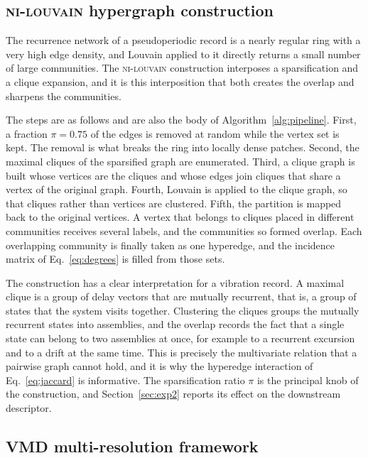 \documentclass[10pt,a4paper,twocolumn]{article}
\newcommand{\nilouvain}{\textsc{ni-louvain}}
\begin{document}
\subsection{\nilouvain{} hypergraph construction}
\label{sec:nilouvain}

The recurrence network of a pseudoperiodic record is a nearly regular ring
with a very high edge density, and Louvain applied to it directly returns a
small number of large communities.  The \nilouvain{} construction interposes a
sparsification and a clique expansion, and it is this interposition that both
creates the overlap and sharpens the communities.

The steps are as follows and are also the body of
Algorithm~\ref{alg:pipeline}.  First, a fraction $\pi = 0.75$ of the edges is
removed at random while the vertex set is kept.  The removal is what breaks
the ring into locally dense patches.  Second, the maximal cliques of the
sparsified graph are enumerated.  Third, a clique graph is built whose
vertices are the cliques and whose edges join cliques that share a vertex of
the original graph.  Fourth, Louvain is applied to the clique graph, so that
cliques rather than vertices are clustered.  Fifth, the partition is mapped
back to the original vertices.  A vertex that belongs to cliques placed in
different communities receives several labels, and the communities so formed
overlap.  Each overlapping community is finally taken as one hyperedge, and
the incidence matrix of Eq.~\eqref{eq:degrees} is filled from those sets.

The construction has a clear interpretation for a vibration record.  A
maximal clique is a group of delay vectors that are mutually recurrent, that
is, a group of states that the system visits together.  Clustering the
cliques groups the mutually recurrent states into assemblies, and the overlap
records the fact that a single state can belong to two assemblies at once, for
example to a recurrent excursion and to a drift at the same time.  This is
precisely the multivariate relation that a pairwise graph cannot hold, and it
is why the hyperedge interaction of Eq.~\eqref{eq:jaccard} is informative.
The sparsification ratio $\pi$ is the principal knob of the construction, and
Section~\ref{sec:exp2} reports its effect on the downstream descriptor.

\subsection{VMD multi-resolution framework}
\label{sec:vmd}
\end{document}
